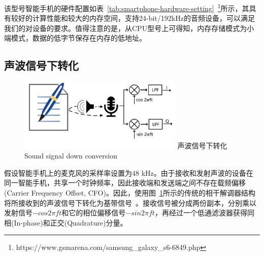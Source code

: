 该型号智能手机的硬件配置如表~\ref{tab:smartphone-hardware-setting}~\footnote{https://www.gsmarena.com/samsung\_galaxy\_s6-6849.php}所示，其具有较好的计算性能和较大的内存空间，支持24-bit/192kHz的音频设备，可以满足我们的对设备的要求。值得注意的是，从CPU型号上可得知，内存存储模式为小端模式，数据的低字节保存在内存的低地址。

\subsection{声波信号下转化}
\begin{figure}[!htp]
  \centering
  \includegraphics[width=0.7\textwidth]{figure/down-conversion.pdf}
  \bicaption
    {声波信号下转化}
    {Sound signal down conversion}
  \label{fig:sound-signal-down-conversion}
\end{figure}
假设智能手机上的麦克风的采样率设置为48 kHz。由于接收和发射声波的设备在同一智能手机，共享一个时钟频率，因此接收端和发送端之间不存在载频偏移(Carrier Frequency Offset, CFO)。因此，使用图~\ref{fig:sound-signal-down-conversion}所示的传统的相干解调器结构将所接收到的声波信号下转化为基带信号~\cite{tse2005fundamentals}。接收信号被分成两份副本，分别乘以发射信号$-cos2\pi ft$和它的相位偏移信号$-sin2\pi ft$，再经过一个低通滤波器获得同相(In-phase)和正交(Quadrature)分量。

